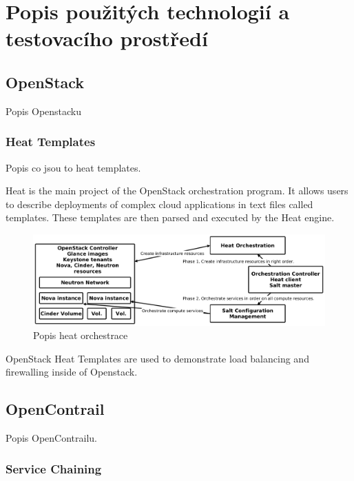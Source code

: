 \chapter{Popis použitých technologií a testovacího prostředí}

\section{OpenStack}\label{sub:interaction}

Popis Openstacku

\subsection{Heat Templates}

Popis co jsou to heat templates.

Heat is the main project of the OpenStack orchestration program. It allows users to describe deployments of complex cloud applications in text files called templates. These templates are then parsed and executed by the Heat engine.

\begin{figure}[h]
\begin{centering}
\includegraphics[scale=0.21]{images/heat}
\par\end{centering}
\caption{Popis heat orchestrace\label{fig:heat}}
\end{figure}

OpenStack Heat Templates are used to demonstrate load balancing and firewalling inside of Openstack.

\section{OpenContrail}\label{sub:interaction}

Popis OpenContrailu.

\subsection{Service Chaining}

